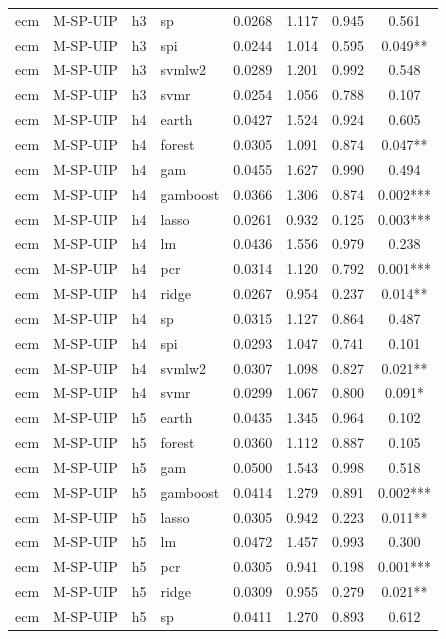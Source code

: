 \begin{ThreePartTable}
\begin{longtable}[t]{llclcccc}
ecm & M-SP-UIP & h3 & sp & 0.0268 & 1.117 & 0.945 & 0.561\\
ecm & M-SP-UIP & h3 & spi & 0.0244 & 1.014 & 0.595 & 0.049**\\
ecm & M-SP-UIP & h3 & svmlw2 & 0.0289 & 1.201 & 0.992 & 0.548\\
ecm & M-SP-UIP & h3 & svmr & 0.0254 & 1.056 & 0.788 & 0.107\\
\addlinespace
ecm & M-SP-UIP & h4 & earth & 0.0427 & 1.524 & 0.924 & 0.605\\
ecm & M-SP-UIP & h4 & forest & 0.0305 & 1.091 & 0.874 & 0.047**\\
ecm & M-SP-UIP & h4 & gam & 0.0455 & 1.627 & 0.990 & 0.494\\
ecm & M-SP-UIP & h4 & gamboost & 0.0366 & 1.306 & 0.874 & 0.002***\\
ecm & M-SP-UIP & h4 & lasso & 0.0261 & 0.932 & 0.125 & 0.003***\\
ecm & M-SP-UIP & h4 & lm & 0.0436 & 1.556 & 0.979 & 0.238\\
ecm & M-SP-UIP & h4 & pcr & 0.0314 & 1.120 & 0.792 & 0.001***\\
ecm & M-SP-UIP & h4 & ridge & 0.0267 & 0.954 & 0.237 & 0.014**\\
ecm & M-SP-UIP & h4 & sp & 0.0315 & 1.127 & 0.864 & 0.487\\
ecm & M-SP-UIP & h4 & spi & 0.0293 & 1.047 & 0.741 & 0.101\\
ecm & M-SP-UIP & h4 & svmlw2 & 0.0307 & 1.098 & 0.827 & 0.021**\\
ecm & M-SP-UIP & h4 & svmr & 0.0299 & 1.067 & 0.800 & 0.091*\\
\addlinespace
ecm & M-SP-UIP & h5 & earth & 0.0435 & 1.345 & 0.964 & 0.102\\
ecm & M-SP-UIP & h5 & forest & 0.0360 & 1.112 & 0.887 & 0.105\\
ecm & M-SP-UIP & h5 & gam & 0.0500 & 1.543 & 0.998 & 0.518\\
ecm & M-SP-UIP & h5 & gamboost & 0.0414 & 1.279 & 0.891 & 0.002***\\
ecm & M-SP-UIP & h5 & lasso & 0.0305 & 0.942 & 0.223 & 0.011**\\
ecm & M-SP-UIP & h5 & lm & 0.0472 & 1.457 & 0.993 & 0.300\\
ecm & M-SP-UIP & h5 & pcr & 0.0305 & 0.941 & 0.198 & 0.001***\\
ecm & M-SP-UIP & h5 & ridge & 0.0309 & 0.955 & 0.279 & 0.021**\\
ecm & M-SP-UIP & h5 & sp & 0.0411 & 1.270 & 0.893 & 0.612\\

\end{longtable}
\end{ThreePartTable}
